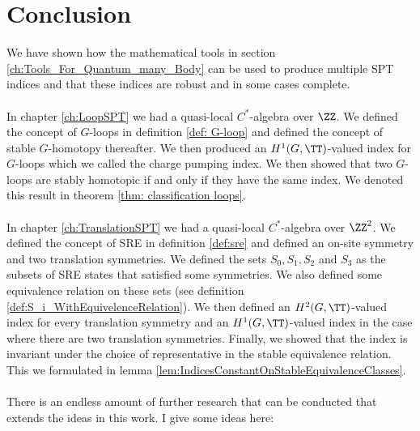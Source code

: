 \chapter{Conclusion}\label{ch:conclusion}

We have shown how the mathematical tools in section \ref{ch:Tools_For_Quantum_many_Body} can be used to produce multiple SPT indices and that these indices are robust and in some cases complete.
\\\\
In chapter \ref{ch:LoopSPT} we had a quasi-local $C^*$-algebra over $\ZZ$. We defined the concept of $G$-loops in definition \ref{def: G-loop} and defined the concept of stable $G$-homotopy thereafter. We then produced an $H^1(G,\TT)$-valued index for $G$-loops which we called the charge pumping index. We then showed that two $G$-loops are stably homotopic if and only if they have the same index. We denoted this result in theorem \ref{thm: classification loops}.
\\\\
In chapter \ref{ch:TranslationSPT} we had a quasi-local $C^*$-algebra over $\ZZ^2$. We defined the concept of SRE in definition \ref{def:sre} and defined an on-site symmetry and two translation symmetries. We defined the sets $S_0,S_1,S_2$ and $S_3$ as the subsets of SRE states that satisfied some symmetries. We also defined some equivalence relation on these sets (see definition \ref{def:S_i_WithEquivelenceRelation}). We then defined an $H^2(G,\TT)$-valued index for every translation symmetry and an $H^1(G,\TT)$-valued index in the case where there are two translation symmetries. Finally, we showed that the index is invariant under the choice of representative in the stable equivalence relation. This we formulated in lemma \ref{lem:IndicesConstantOnStableEquivalenceClasses}.
\\\\
There is an endless amount of further research that can be conducted that extends the ideas in this work. I give some ideas here:
